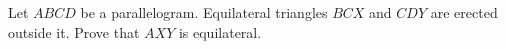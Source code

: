 Let $ABCD$ be a parallelogram. Equilateral triangles $BCX$ and $CDY$ are erected outside it. Prove that $AXY$ is equilateral.
